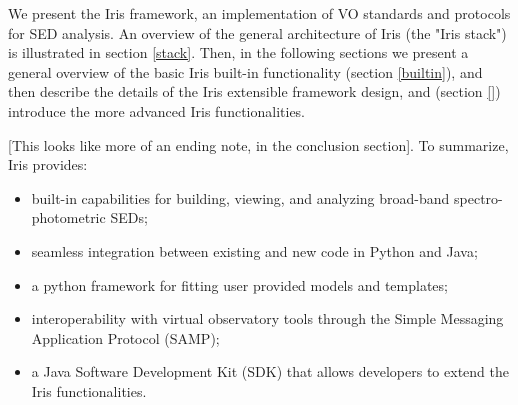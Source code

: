 We present the Iris framework, an implementation of VO standards and protocols for SED analysis. An overview of the general architecture of Iris (the "Iris stack") is illustrated in section \ref{stack}. Then, in the following sections we present a general overview of the basic Iris built-in functionality (section \ref{builtin}), and then describe the details of the Iris extensible framework design, and (section \ref{}) introduce the more advanced Iris functionalities.



[This looks like more of an ending note, in the conclusion section]. To summarize, Iris provides:
\begin{itemize}
\item built-in capabilities for building, viewing, and analyzing broad-band spectro-photometric SEDs;
\item seamless integration between existing and new code in Python and Java;
\item a python framework for fitting user provided models and templates;
\item interoperability with virtual observatory tools through the Simple Messaging Application Protocol (SAMP);
\item a Java Software Development Kit (SDK) that allows developers to extend the Iris functionalities.
\end{itemize}